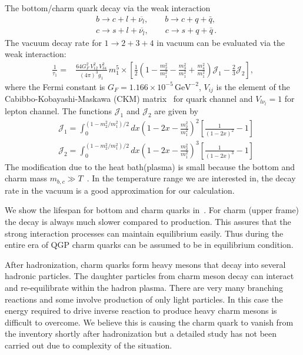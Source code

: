 The bottom/charm quark decay via the weak interaction  
\begin{align}
 &b\longrightarrow c+l+\overline{\nu_l}, \qquad b\longrightarrow c+q+\bar{q},\\
&c\longrightarrow s+l+\overline{\nu_l},\qquad c\longrightarrow s+q+\bar{q}\,.
\end{align}
The vacuum decay rate for $1\to2+3+4$ in vacuum can be evaluated via the weak interaction:
\begin{align}
\frac{1}{\tau_1}=&\frac{64G^2_F\,V^2_{12}\,V^2_{34}}{(4\pi)^3g_1}\,m^5_1\times\left[\frac{1}{2}{\left(1-\frac{m^2_2}{m^2_1}-\frac{m^2_3}{m^2_1}+\frac{m^2_4}{m^2_1}\right)}\mathcal{J}_1-\frac{2}{3}\mathcal{J}_2\right],
\end{align}
where the Fermi constant is $G_F=1.166\times10^{-5}\,\mathrm{GeV}^{-2}$, $V_{ij}$ is the element of the Cabibbo-Kobayashi-Maskawa (CKM) matrix~\cite{Czarnecki:2004cw} for quark channel and $V_{l\nu_l}=1$ for lepton channel. The functions $\mathcal{J}_1$ and $\mathcal{J}_2$ are given by
\begin{align}
&\mathcal{J}_1\!=\!\!\!\int_0^{(1-m^2_2/m^2_1)/2}\!\!\!\!\!\!\!\!dx\left(1\!-\!2x\!-\!\frac{m^2_2}{m_1^2}\right)^{\!\!2}\left[\frac{1}{(1-2x)^2}-1\right]\\
&\mathcal{J}_2\!=\!\!\!\int_0^{(1-m^2_2/m^2_1)/2}\!\!\!\!\!\!\!\!dx\left(1\!-\!2x\!-\!\frac{m^2_2}{m_1^2}\right)^{\!\!3}\left[\frac{1}{(1-2x)^3}-1\right]
\end{align}
The modification due to the heat bath(plasma) is small because the bottom and charm mass $m_{b,c}\gg T$~\cite{Kuznetsova:2008jt}. In the temperature range we are interested in, the decay rate in the vacuum is a good approximation for our calculation. 

We show the lifespan for bottom and charm quarks in~. For charm (upper frame) the decay is always much slower compared to production. This assures that the strong interaction processes can maintain equilibrium easily. Thus during the entire era of QGP charm quarks can be assumed to be in equilibrium condition. 

After hadronization, charm quarks form heavy mesons that decay into several hadronic particles. The daughter particles from charm meson decay can interact and re-equilibrate within the hadron plasma. There are very many branching reactions and some involve production of only light particles. In this case the energy required to drive inverse reaction to produce heavy charm mesons is difficult to overcome. We believe this is causing the charm quark to vanish from the inventory shortly after hadronization but a detailed study has not been carried out due to complexity of the situation. 

